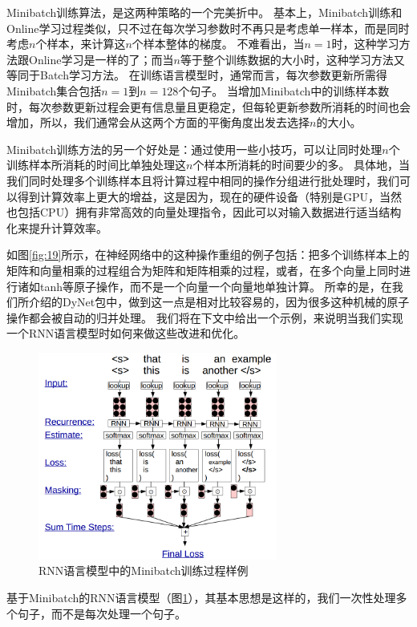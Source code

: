 \documentclass[10pt,a4paper]{ctexart}
\begin{document}
Minibatch训练算法，是这两种策略的一个完美折中。
基本上，Minibatch训练和Online学习过程类似，只不过在每次学习参数时不再只是考虑单一样本，而是同时考虑$n$个样本，来计算这$n$个样本整体的梯度。
不难看出，当$n=1$时，这种学习方法跟Online学习是一样的了；而当$n$等于整个训练数据的大小时，这种学习方法又等同于Batch学习方法。
在训练语言模型时，通常而言，每次参数更新所需得Minibatch集合包括$n=1$到$n=128$个句子。
当增加Minibatch中的训练样本数时，每次参数更新过程会更有信息量且更稳定，但每轮更新参数所消耗的时间也会增加，所以，我们通常会从这两个方面的平衡角度出发去选择$n$的大小。

Minibatch训练方法的另一个好处是：通过使用一些小技巧，可以让同时处理$n$个训练样本所消耗的时间比单独处理这$n$个样本所消耗的时间要少的多。
具体地，当我们同时处理多个训练样本且将计算过程中相同的操作分组进行批处理时，我们可以得到计算效率上更大的增益，这是因为，现在的硬件设备（特别是GPU，当然也包括CPU）拥有非常高效的向量处理指令，因此可以对输入数据进行适当结构化来提升计算效率。

如图\ref{fig:19}所示，在神经网络中的这种操作重组的例子包括：把多个训练样本上的矩阵和向量相乘的过程组合为矩阵和矩阵相乘的过程，或者，在多个向量上同时进行诸如tanh等原子操作，而不是一个向量一个向量地单独计算。
所幸的是，在我们所介绍的DyNet包中，做到这一点是相对比较容易的，因为很多这种机械的原子操作都会被自动的归并处理。
我们将在下文中给出一个示例，来说明当我们实现一个RNN语言模型时如何来做这些改进和优化。

\begin{figure}[H]
\centering
\includegraphics[width=0.7\textwidth]{fig20.png}
\caption{RNN语言模型中的Minibatch训练过程样例}
\label{fig:20}
\end{figure}

基于Minibatch的RNN语言模型（图\ref{fig:20}），其基本思想是这样的，我们一次性处理多个句子，而不是每次处理一个句子。
\end{document}
